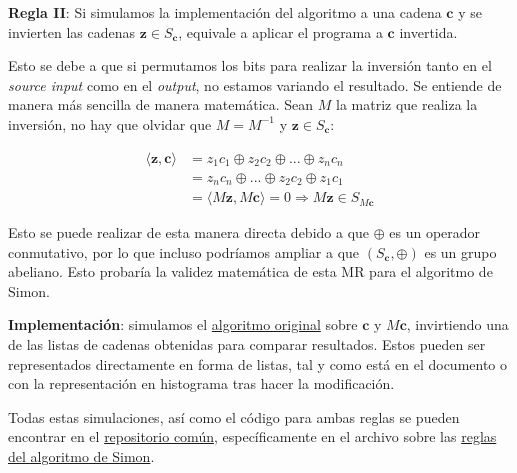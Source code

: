 \textbf{Regla II}: Si simulamos la implementación del algoritmo a una cadena $\mathbf{c}$ y se invierten las cadenas $\mathbf{z}\in S_{\mathbf{c}}$, equivale a aplicar el programa a $\mathbf{c}$ invertida.\newline

Esto se debe a que si permutamos los bits para realizar la inversión tanto en el \textit{source input} como en el \textit{output}, no estamos variando el resultado. Se entiende de manera más sencilla de manera matemática. Sean $M$ la matriz que realiza la inversión, no hay que olvidar que $M=M^{-1}$ y $\mathbf{z} \in S_{\mathbf{c}}$:

\begin{equation}
    \begin{split}
    \langle \mathbf{z},\mathbf{c} \rangle &= z_{1}c_{1} \oplus z_{2}c_{2} \oplus ...  \oplus z_{n}c_{n} \\ &= z_{n}c_{n} \oplus ... \oplus z_{2}c_{2} \oplus z_{1}c_{1} \\ &= \langle M\mathbf{z}, M\mathbf{c} \rangle = 0 \Rightarrow M\mathbf{z} \in S_{M\mathbf{c}}
    \end{split}
\end{equation}\newline

Esto se puede realizar de esta manera directa debido a que $\oplus$ es un operador conmutativo, por lo que incluso podríamos ampliar a que $(S_{\mathbf{c}},\oplus)$ es un grupo abeliano. Esto probaría la validez matemática de esta MR para el algoritmo de Simon. \newline

\textbf{Implementación}: simulamos el \hyperref[Fig:CircuitoSimon1]{algoritmo original} sobre $\mathbf{c}$ y $M\mathbf{c}$, invirtiendo una de las listas de cadenas obtenidas para comparar resultados. Estos pueden ser representados directamente en forma de listas, tal y como está en el documento o con la representación en histograma tras hacer la modificación.\newline

Todas estas simulaciones, así como el código para ambas reglas se pueden encontrar en el \href{https://github.com/rodelanu/TFG/tree/main}{repositorio común}, específicamente en el archivo sobre las \href{https://github.com/rodelanu/TFG/blob/main/3_Simon_Rules.ipynb}{reglas del algoritmo de Simon}.